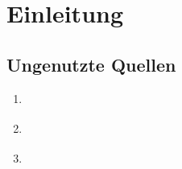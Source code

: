 \chapter{Einleitung}



\section*{Ungenutzte Quellen}
\begin{enumerate}
	\item \cite[20ff]{DER_INTEGRATIONSTEST}
	\item \cite{MODELLGETRIEBENE_SOFTWAREENTWICKLUNG}
	\item \cite{DOMAIN_DRIVEN_DESIGN}
\end{enumerate}
